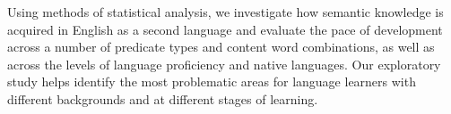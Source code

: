 Using methods of statistical analysis, we investigate how semantic knowledge is acquired in English as a second language and evaluate the pace of development across a number of predicate types and content word combinations, as well as across the levels of language proficiency and native languages. Our exploratory study helps identify the most problematic areas for language learners with different backgrounds and at different stages of learning.
